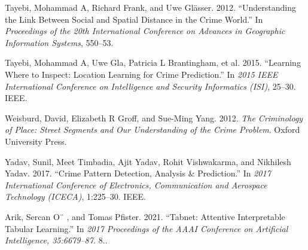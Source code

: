 \documentclass[conference,final,]{IEEEtran}
\newlength{\cslhangindent}
\newenvironment{CSLReferences}[2] %
 {\begin{list}{}{%
  \setlength{\itemindent}{0pt}
  \setlength{\leftmargin}{0pt}
  \setlength{\parsep}{0pt}
  \ifodd #1
   \setlength{\leftmargin}{\cslhangindent}
   \setlength{\itemindent}{-1\cslhangindent}
  \fi
  \setlength{\itemsep}{#2\baselineskip}}}
 {\end{list}}
\begin{document}
\begin{CSLReferences}{1}{0}
Tayebi, Mohammad A, Richard Frank, and Uwe Glässer. 2012.
{``Understanding the Link Between Social and Spatial Distance in the
Crime World.''} In \emph{Proceedings of the 20th International
Conference on Advances in Geographic Information Systems}, 550--53.

Tayebi, Mohammad A, Uwe Gla, Patricia L Brantingham, et al. 2015.
{``Learning Where to Inspect: Location Learning for Crime Prediction.''}
In \emph{2015 IEEE International Conference on Intelligence and Security
Informatics (ISI)}, 25--30. IEEE.

Weisburd, David, Elizabeth R Groff, and Sue-Ming Yang. 2012. \emph{The
Criminology of Place: Street Segments and Our Understanding of the Crime
Problem}. Oxford University Press.

Yadav, Sunil, Meet Timbadia, Ajit Yadav, Rohit Vishwakarma, and
Nikhilesh Yadav. 2017. {``Crime Pattern Detection, Analysis \&
Prediction.''} In \emph{2017 International Conference of Electronics,
Communication and Aerospace Technology (ICECA)}, 1:225--30. IEEE.

Arik, Sercan O¨ , and Tomas Pfister. 2021. {``Tabnet: Attentive
Interpretable Tabular Learning.''} In \emph{2017 Proceedings of the
AAAI Conference on Artificial Intelligence, 35:6679–87.}
8..

\end{CSLReferences}
\end{document}
